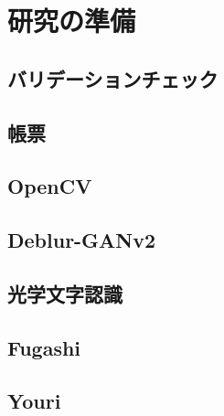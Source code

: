 \chapter{研究の準備}\label{cha:Preparation}



\section{バリデーションチェック}\label{sec:validation_check}


\section{帳票}\label{sec:ledger}


\section{OpenCV}\label{sec:OpenCV}


\section{Deblur-GANv2}\label{sec:Deblur-GANv2}


\section{光学文字認識}\label{sec:Optical-Charactor-Recognition}


\section{Fugashi}\label{sec:Fugashi}


\section{Youri}\label{sec:Youri}